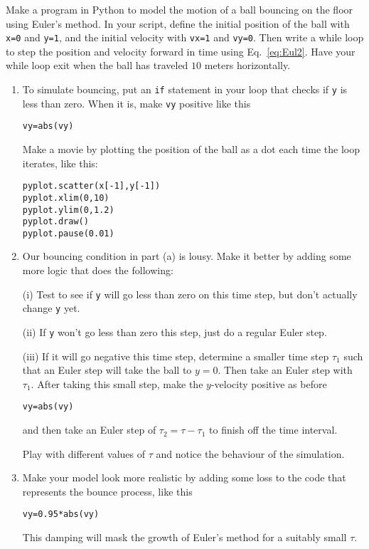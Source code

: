 \begin{enumerate}
\probtwo Make a program in Python to model the motion of a ball bouncing on
    the floor using Euler's method.  In your script, define the initial
    position of the ball with \texttt{x=0} and \texttt{y=1}, and the
    initial velocity with \texttt{vx=1} and \texttt{vy=0}. Then write a
    while loop to step the position and velocity forward in time using
    Eq.~\eqref{eq:Eul2}. Have your while
    loop exit when the ball has traveled $10$ meters horizontally.  

\begin{enumerate}
    \item To simulate bouncing, put an \texttt{if}
        statement in your loop that checks if \texttt{y} is
        less than zero. When it is, make \texttt{vy}
        positive like this
\begin{Verbatim}
vy=abs(vy)
\end{Verbatim}
    Make a movie by plotting the position of the ball as a dot
    each time the loop iterates, like this:
\begin{Verbatim}
pyplot.scatter(x[-1],y[-1])
pyplot.xlim(0,10)
pyplot.ylim(0,1.2)
pyplot.draw()
pyplot.pause(0.01)\end{Verbatim}

\item Our bouncing condition in part (a) is lousy.  Make it
    better by adding some more logic that does the following:

    (i) Test to see if \texttt{y} will go less than zero on
    this time step, but don't actually change \texttt{y} yet.

    (ii) If \texttt{y} won't go less than zero this step,
    just do a regular Euler step.

    (iii) If it will go negative this time step, determine a smaller time
    step $\tau_1$ such that an Euler step will take the ball to $y=0$.
    Then take an Euler step with $\tau_1$. After taking this small step,
    make the $y$-velocity positive as before
\begin{Verbatim}
vy=abs(vy)
\end{Verbatim}
    and then take an Euler step of $\tau_2 = \tau-\tau_1$
    to finish off the time interval.

    Play with different values of $\tau$ and notice the behaviour of
    the simulation.

    \item Make your model look more realistic by adding some loss to the
        code that represents the bounce process, like this
\begin{Verbatim}
vy=0.95*abs(vy)
\end{Verbatim}
    This damping will mask the growth of Euler's method for a
    suitably small $\tau$.


\end{enumerate}
\end{enumerate}
